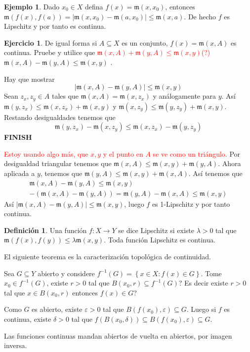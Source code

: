 \documentclass[12pt]{article}
\theoremstyle{plain}
\theoremstyle{definition}
\newtheorem{Def}[Th]{Definición}       %
\newtheorem{Ex}[Th]{Ejemplo}               %
\newtheorem{Ej}[Th]{Ejercicio}
\theoremstyle{remark}
\numberwithin{equation}{section}
\newcommand{\mm}{\mathfrak{m}}      %
\renewcommand{\leq}{\leqslant}      %
\renewcommand{\:}{\colon}           %
\newcommand{\conj}[1]{\left\lbrace#1\right\rbrace}
\begin{document}
\begin{multicols}{2}
 \begin{Ex}
   Dado $x_0\in X$ defina $f(x)=\mm(x,x_0)$, entonces $\mm(f(x),f(a))=|\mm(x,x_0)-\mm(a,x_0)|\leq \mm(x,a)$. De hecho $f$ es Lipschitz y por tanto es continua.
 \end{Ex}

\begin{Ej}
  De igual forma si $A\subseteq X$ es un conjunto, $f(x)=\mm(x,A)$ es continua. Pruebe y utilice que \textcolor{red}{$\mm(x,A)+\mm(y,A)\leq \mm(x,y)$(?)} $\mm(x,A)-\mm(y,A)\leq \mm(x,y)$ .
\end{Ej}

\begin{ptcb}
Hay que mostrar
$$|\mm(x,A)-\mm(y,A)|\leq \mm(x,y)$$
Sean $z_x,z_y\in A$ tales que $\mm(x,A)=\mm(x,z_x)$ y análogamente para $y$. Así $\mm(y,z_x)\leq\mm(x,z_x)+\mm(x,y)$ y $\mm(x,z_y)\leq\mm(y,z_y)+\mm(x,y)$. Restando desigualdades tenemos que
$$\mm(y,z_x)-\mm(x,z_y)\leq\mm(x,z_x)-\mm(y,z_y)$$
\textbf{FINISH}
\end{ptcb}
\begin{ptcb}
\textcolor{red}{Estoy usando algo más, que $x,y$ y el punto en $A$ se ve como un triángulo.}
Por desigualdad triangular tenemos que $\mm(x,A)\leq\mm(x,y)+\mm(y,A)$. Ahora aplicada a $y$, tenemos que $\mm(y,A)\leq\mm(x,y)+\mm(x,A)$. Así tenemos que
\begin{gather*}
  \mm(x,A)-\mm(y,A)\leq\mm(x,y)\\
  -(\mm(x,A)-\mm(y,A))=\mm(y,A)-\mm(x,A)\leq\mm(x,y)
\end{gather*}
Así $|\mm(x,A)-\mm(y,A)|\leq\mm(x,y)$, luego $f$ es 1-Lipschitz y por tanto continua.
\end{ptcb}
\begin{Def}
  Una función $f\colon X\to Y$ se dice Lipschitz si existe $\lambda >0$ tal que $\mm(f(x),f(y))\leq \lambda\mm(x,y)$. Toda función Lipschitz es continua.
\end{Def}

El siguiente teorema es la caracterización topológica de continuidad. \par
Sea $G\subseteq Y$ abierto y considere $f^{-1}(G)=\conj{x\in X\colon f(x)\in G}$. Tome $x_0\in f^{-1}(G)$, existe $r>0$ tal que $B(x_0,r)\subseteq f^{-1}(G)$? Es decir existe $r>0$ tal que $x\in B(x_0,r)$ entonces $f(x)\in G$?\par
Como $G$ es abierto, existe $\varepsilon>0$ tal que $B(f(x_0),\varepsilon)\subseteq G$. Luego si $f$ es continua, existe $\delta>0$ tal que $f(B(x_0,\delta))\subseteq B(f(x_0),\varepsilon)\subseteq G$.\par Las funciones continuas mandan abiertos de vuelta en abiertos, por imagen inversa.


\end{multicols}
\end{document}
